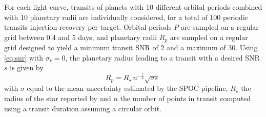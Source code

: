 \documentclass[modern]{aastex631}
\begin{document}
For each light curve, transits of planets with 10 different orbital periods combined with 10 planetary radii are individually considered, for a total of 100 periodic transits injection-recovery per target. Orbital periods $P$ are sampled on a regular grid between 0.4 and 5 days, and planetary radii $R_p$ are sampled on a regular grid designed to yield a minimum transit SNR of 2 and a maximum of 30. Using \autoref{eq:snr} with $\sigma_r = 0$, the planetary radius leading to a transit with a desired SNR $s$ is given by
\begin{equation*}
    R_p = R_{\star}\,n^{-\frac{1}{4}} \sqrt{\sigma s}\ %
\end{equation*}
with $\sigma$ equal to the mean uncertainty estimated by the SPOC pipeline, $R_\star$ the radius of the star reported by \cite{Ramsay2020} and $n$ the number of points in transit computed using a transit duration assuming a circular orbit.\\\\
\end{document}
